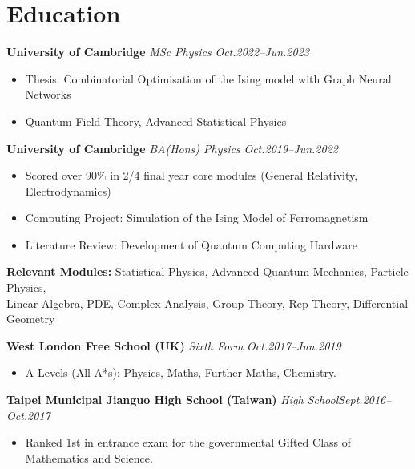 \documentclass[11pt,a4paper,roman]{moderncv}        %
\begin{document}
\makecvtitle

\section{Education}

\textbf{University of Cambridge} \textit{MSc Physics} \hfill \textit{Oct.2022--Jun.2023}
\begin{itemize}
	\item Thesis: Combinatorial Optimisation of the Ising model with Graph Neural Networks
	\item Quantum Field Theory, Advanced Statistical Physics
\end{itemize}

\vspace*{3mm}


\textbf{University of Cambridge} \textit{BA(Hons) Physics} \hfill \textit{Oct.2019--Jun.2022}
\begin{itemize}
	\item Scored over 90\% in 2/4 final year core modules (General Relativity, Electrodynamics)
	\item Computing Project: Simulation of the Ising Model of Ferromagnetism
	\item Literature Review: Development of Quantum Computing Hardware
\end{itemize}
\vspace*{1mm}
\textbf{Relevant Modules:} Statistical Physics, Advanced Quantum Mechanics, Particle Physics,\\
Linear Algebra, PDE, Complex Analysis, Group Theory, Rep Theory, Differential Geometry
\vspace*{3mm}

\textbf{West London Free School (UK)} \textit{Sixth Form} \hfill \textit{Oct.2017--Jun.2019}
\begin{itemize}
	\item{A-Levels (All A*s): Physics, Maths, Further Maths, Chemistry.}
\end{itemize}
\vspace*{3mm}

\textbf{Taipei Municipal Jianguo High School (Taiwan)} \textit{High School}\hfill \textit{Sept.2016--Oct.2017}
\begin{itemize}
	\item{Ranked 1st in entrance exam for the governmental Gifted Class of Mathematics and Science.}
\end{itemize}
\end{document}
